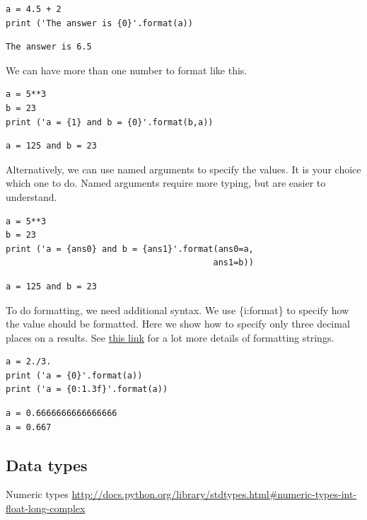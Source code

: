 \documentclass[11pt]{article}
\begin{document}
\begin{verbatim}
a = 4.5 + 2
print ('The answer is {0}'.format(a))
\end{verbatim}

\begin{verbatim}
The answer is 6.5
\end{verbatim}


We can have more than one number to format like this.
\begin{verbatim}
a = 5**3
b = 23
print ('a = {1} and b = {0}'.format(b,a))
\end{verbatim}

\begin{verbatim}
a = 125 and b = 23
\end{verbatim}

Alternatively, we can use named arguments to specify the values. It is your choice which one to do. Named arguments require more typing, but are easier to understand.
\begin{verbatim}
a = 5**3
b = 23
print ('a = {ans0} and b = {ans1}'.format(ans0=a,
                                         ans1=b))
\end{verbatim}

\begin{verbatim}
a = 125 and b = 23
\end{verbatim}

To do formatting, we need additional syntax. We use \{i:format\} to specify how the value should be formatted. Here we show how to specify only three decimal places on a results. See \href{http://docs.python.org/library/stdtypes.html\#string-formatting-operations}{this link} for a lot more details of formatting strings.
\begin{verbatim}
a = 2./3.
print ('a = {0}'.format(a))
print ('a = {0:1.3f}'.format(a))
\end{verbatim}

\begin{verbatim}
a = 0.6666666666666666
a = 0.667
\end{verbatim}


\subsection{Data types}
\label{sec:orgba42d6f}
Numeric types \url{http://docs.python.org/library/stdtypes.html\#numeric-types-int-float-long-complex}
\end{document}
